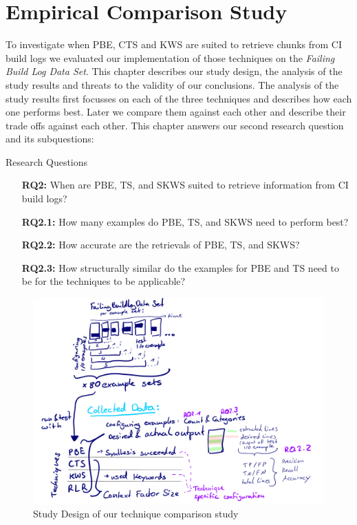 \documentclass[\myrootdir/main.tex]{subfiles}
\begin{document}
\chapter{Empirical Comparison Study}
\label{sec:study}
To investigate when PBE, CTS and KWS are suited to retrieve chunks from CI build logs we evaluated our implementation of those techniques on the \emph{Failing Build Log Data Set}.
This chapter describes our study design, the analysis of the study results and threats to the validity of our conclusions.
The analysis of the study results first focusses on each of the three techniques and describes how each one performs best.
Later we compare them against each other and describe their trade offs against each other.
This chapter answers our second research question and its subquestions:
\begin{simplebox}{Research Questions}
\begin{itemize}
  \item[\textbf{RQ2:}] When are PBE, TS, and SKWS suited to retrieve information from CI build logs?
  \item[\textbf{RQ2.1:}] How many examples do PBE, TS, and SKWS need to perform best?
  \item[\textbf{RQ2.2:}] How accurate are the retrievals of PBE, TS, and SKWS?
  \item[\textbf{RQ2.3:}] How structurally similar do the examples for PBE and TS need to be for the techniques to be applicable?
\end{itemize}
\end{simplebox}

\begin{figure}[htbp]
	\centering
	\includegraphics[width=\textwidth, clip]{img/study-design.pdf}
	\caption{Study Design of our technique comparison study}
	\label{fig:study}
\end{figure}
\end{document}
